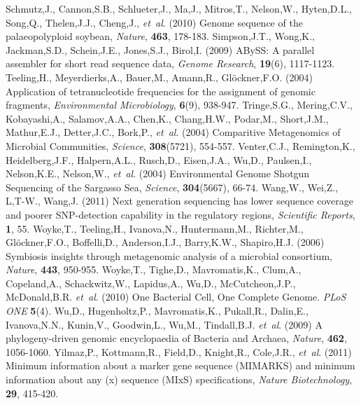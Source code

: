 \documentclass[phd,tocprelim]{cornell}
\begin{document}
\begin{thebibliography}{}
 Schmutz,J., Cannon,S.B., Schlueter,J., Ma,J., Mitros,T., Nelson,W., Hyten,D.L., Song,Q., Thelen,J.J., Cheng,J., {\it et~al}. (2010) Genome sequence of the palaeopolyploid soybean, {\it Nature}, {\bf 463}, 178-183.
 Simpson,J.T., Wong,K., Jackman,S.D., Schein,J.E., Jones,S.J., Birol,I. (2009) ABySS: A parallel assembler for short read sequence data, {\it Genome Research}, {\bf 19}(6), 1117-1123.
 Teeling,H., Meyerdierks,A., Bauer,M., Amann,R., Glöckner,F.O. (2004) Application of tetranucleotide frequencies for the assignment of genomic fragments, {\it Environmental Microbiology}, {\bf 6}(9), 938-947.
 Tringe,S.G., Mering,C.V., Kobayashi,A., Salamov,A.A., Chen,K., Chang,H.W., Podar,M., Short,J.M., Mathur,E.J., Detter,J.C., Bork,P., {\it et~al}. (2004) Comparitive Metagenomics of Microbial Communities, {\it Science}, {\bf 308}(5721), 554-557.
 Venter,C.J., Remington,K., Heidelberg,J.F., Halpern,A.L., Rusch,D., Eisen,J.A., Wu,D., Paulsen,I., Nelson,K.E., Nelson,W., {\it et~al}. (2004) Environmental Genome Shotgun Sequencing of the Sargasso Sea, {\it Science}, {\bf 304}(5667), 66-74.
 Wang,W., Wei,Z., L,T-W., Wang,J. (2011) Next generation sequencing has lower sequence coverage and poorer SNP-detection capability in the regulatory regions, {\it Scientific Reports}, {\bf 1}, 55.
 Woyke,T., Teeling,H., Ivanova,N., Huntermann,M., Richter,M., Glöckner,F.O., Boffelli,D., Anderson,I.J., Barry,K.W., Shapiro,H.J. (2006) Symbiosis insights through metagenomic analysis of a microbial consortium, {\it Nature}, {\bf 443}, 950-955.    
 Woyke,T., Tighe,D., Mavromatis,K., Clum,A., Copeland,A., Schackwitz,W., Lapidus,A., Wu,D., McCutcheon,J.P., McDonald,B.R. {\it et~al}. (2010) One Bacterial Cell, One Complete Genome. {\it PLoS ONE} {\bf 5}(4).
  Wu,D., Hugenholtz,P., Mavromatis,K., Pukall,R., Dalin,E., Ivanova,N.N., Kunin,V., Goodwin,L., Wu,M., Tindall,B.J. {\it et~al}. (2009) A phylogeny-driven genomic encyclopaedia of Bacteria and Archaea, {\it Nature}, {\bf 462}, 1056-1060.
 Yilmaz,P., Kottmann,R., Field,D., Knight,R., Cole,J.R., {\it et~al}. (2011) Minimum information about a marker gene sequence (MIMARKS) and minimum information about any (x) sequence (MIxS) specifications, {\it Nature Biotechnology}, {\bf 29}, 415-420.

\end{thebibliography}
\end{document}
